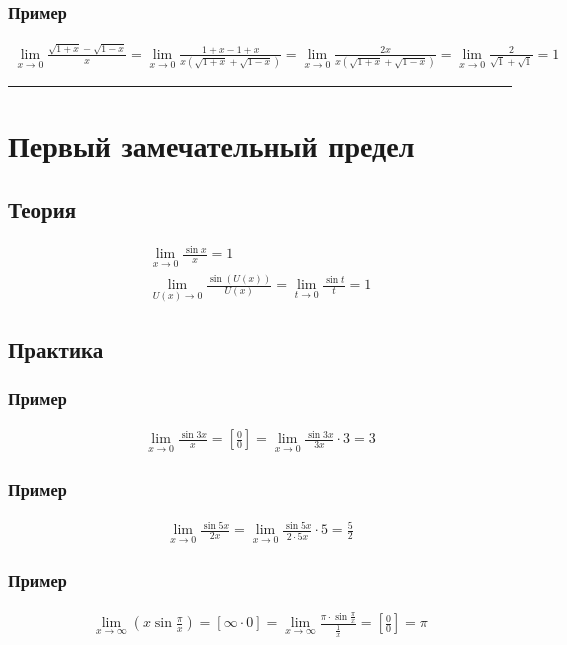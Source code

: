 \documentclass{article}
\begin{document}
\subsubsection{Пример}
\begin{gather*}
    \lim_{x \to 0} \frac{\sqrt{1 + x} - \sqrt{1 - x}}{x} =
    \lim_{x \to 0} \frac{1 + x - 1 + x}{x \left( \sqrt{1 + x} + \sqrt{1 - x} \right)} =
    \lim_{x \to 0} \frac{2x}{x \left( \sqrt{1 + x} + \sqrt{1 - x} \right)} =
    \lim_{x \to 0} \frac{2}{\sqrt{1} + \sqrt{1}} = 1
\end{gather*}



\par\noindent\rule{\textwidth}{1pt}
\section{Первый замечательный предел}

\subsection{Теория}
\begin{gather*}
    \lim_{x \to 0} \frac{\sin x}{x} = 1 \\
    \lim_{U(x) \to 0} \frac{\sin (U(x))}{U(x)} = 
    \lim_{t \to 0} \frac{\sin t}{t} = 1
\end{gather*}


\subsection{Практика}

\subsubsection{Пример}
\begin{gather*}
    \lim_{x \to 0} \frac{\sin 3x}{x} =
    \left[ \frac{0}{0} \right] =
    \lim_{x \to 0} \frac{\sin 3x}{3x} \cdot 3 = 3
\end{gather*}

\subsubsection{Пример}
\begin{gather*}
    \lim_{x \to 0} \frac{\sin 5x}{2x} =
    \lim_{x \to 0} \frac{\sin 5x}{2 \cdot 5x} \cdot 5 = \frac{5}{2}
\end{gather*}

\subsubsection{Пример}
\begin{gather*}
    \lim_{x \to \infty} \left( x \sin \frac{\pi}{x} \right) =
    [\infty \cdot 0] =
    \lim_{x \to \infty} \frac{\pi \cdot \sin \frac{\pi}{x}}{\frac{1}{x}} =
    \left[ \frac{0}{0} \right] = \pi
\end{gather*}
\end{document}
